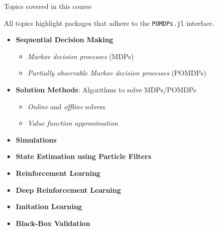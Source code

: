 \begin{frame}[fragile]{Topics covered in this course}

\begin{highlightblock}
All topics highlight packages that adhere to the \texttt{POMDPs.jl} interface.
\end{highlightblock}

\begin{itemize}
    \item \textbf{Sequential Decision Making}
    \begin{itemize}
        \item \textit{Markov decision processes} (MDPs)
        \item \textit{Partially observable Markov decision processes} (POMDPs)
    \end{itemize}
    \item \textbf{Solution Methods}: Algorithms to solve MDPs/POMDPs
    \begin{itemize}
        \item \textit{Online} and \textit{offline} solvers
        \item \textit{Value function approximation}
    \end{itemize}
    \item \textbf{Simulations}
    \item \textbf{State Estimation using Particle Filters}
    \item \textbf{Reinforcement Learning}
    \item \textbf{Deep Reinforcement Learning}
    \item \textbf{Imitation Learning}
    \item \textbf{Black-Box Validation}
\end{itemize}


\end{frame}

